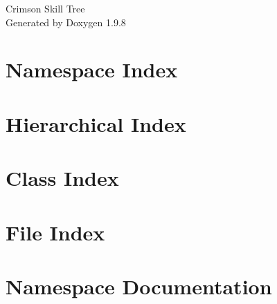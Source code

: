 \documentclass[twoside]{book}
\newcommand{\+}{\discretionary{\mbox{\scriptsize$\hookleftarrow$}}{}{}}
\newcommand{\clearemptydoublepage}{%
    \newpage{\pagestyle{empty}\cleardoublepage}%
  }
\begin{document}
  \raggedbottom
    \hypersetup{pageanchor=false,
                bookmarksnumbered=true,
                pdfencoding=unicode
               }
  \begin{titlepage}
  \vspace*{7cm}
  \begin{center}%
  {\Large Crimson Skill Tree}\\
  \vspace*{1cm}
  {\large Generated by Doxygen 1.9.8}\\
  \end{center}
  \end{titlepage}
  \clearemptydoublepage
  \tableofcontents
  \clearemptydoublepage
  \hypersetup{pageanchor=true}

\chapter{Namespace Index}

\chapter{Hierarchical Index}

\chapter{Class Index}

\chapter{File Index}

\chapter{Namespace Documentation}






\end{document}
